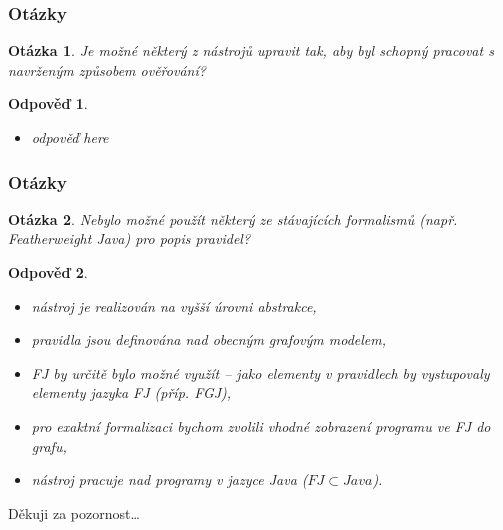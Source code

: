 \documentclass{beamer}
\newtheorem*{question}{Otázka}
\newtheorem*{response}{Odpověď}
\begin{document}
\begin{frame}
  \frametitle{Otázky}
  \begin{question}
    Je možné některý z nástrojů upravit tak, aby byl schopný pracovat s navrženým způsobem ověřování?
  \end{question}
  \begin{response}
    \begin{itemize}
    \item odpověď here
    \end{itemize}
  \end{response}
\end{frame}

\begin{frame}
  \frametitle{Otázky}
  \begin{question}
    Nebylo možné použít některý ze stávajících formalismů (např. Featherweight Java) pro popis pravidel?
  \end{question}
  \begin{response}
    \begin{itemize}
    \item nástroj je realizován na vyšší úrovni abstrakce,
    \item pravidla jsou definována nad obecným grafovým modelem,
    \item FJ by určitě bylo možné využít -- jako elementy v pravidlech by vystupovaly elementy jazyka FJ (příp. FGJ),
    \item pro exaktní formalizaci bychom zvolili vhodné zobrazení programu ve FJ do grafu,
    \item nástroj pracuje nad programy v jazyce Java ($FJ \subset Java$).
    \end{itemize}
  \end{response}
\end{frame}

\begin{frame}
  \begin{center}
    {\huge Děkuji za pozornost\ldots}
  \end{center}
\end{frame}
\end{document}
